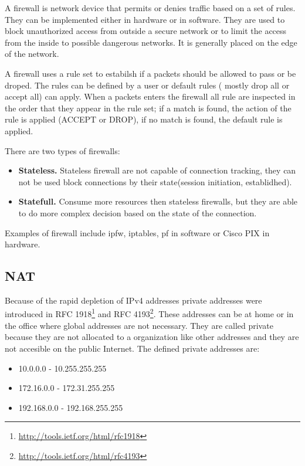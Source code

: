 A firewall is network device that permits or denies traffic based on a set of rules. They can be implemented either in
hardware or in software. They are used to block unauthorized access from outside a secure network or to limit the access
from the inside to possible dangerous networks. It is generally placed on the edge of the network.

A firewall uses a rule set to estabilsh if a packets should be allowed to pass or be droped. The rules can be defined
by a user or default rules ( mostly drop all or accept all) can apply. When a packets enters the firewall all rule
are inspected in the order that they appear in the rule set; if a match is found, the action of the rule is applied
(ACCEPT or DROP), if no match is found, the default rule is applied.

There are two types of firewalls:
\begin{itemize}
  \item \textbf{Stateless.} Stateless firewall are not capable of connection tracking, they can not be used block
connections by their state(session initiation, establidhed). 
  \item \textbf{Statefull.} Consume more resources then stateless firewalls, but they are able to do more complex 
decision based on the state of the connection.
\end{itemize} 

Examples of firewall include ipfw, iptables, pf in software or Cisco PIX in hardware.


\subsection{NAT}
\label{sub-sec:nat}

Because of the rapid depletion of IPv4 addresses private addresses were introduced in RFC 1918\footnote{\url{http://tools.ietf.org/html/rfc1918}}
 and RFC 4193\footnote{\url{http://tools.ietf.org/html/rfc4193}}. These addresses can be at home or in the office
where global addresses are not necessary. They are called private because they are not allocated to a organization like
other addresses and they are not accesible on the public Internet. The defined private addresses are:
\begin{itemize}
  \item 10.0.0.0 - 10.255.255.255
  \item 172.16.0.0 - 172.31.255.255
  \item 192.168.0.0 - 192.168.255.255
\end{itemize}

